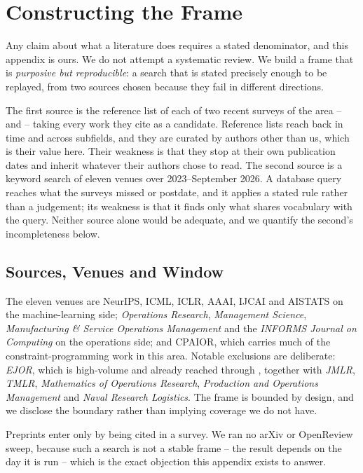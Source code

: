 \section{Constructing the Frame}
\label{sec:ECSearch}

Any claim about what a literature does requires a stated denominator, and this appendix is ours. We
do not attempt a systematic review. We build a frame that is \emph{purposive but reproducible}: a
search that is stated precisely enough to be replayed, from two sources chosen because they fail in
different directions.

The first source is the reference list of each of two recent surveys of the area -- \citet{mandi2024decision}
and \citet{sadana2025survey} -- taking every work they cite as a candidate. Reference lists reach
back in time and across subfields, and they are curated by authors other than us, which is their
value here. Their weakness is that they stop at their own publication dates and inherit whatever
their authors chose to read. The second source is a keyword search of eleven venues over
2023--September 2026. A database query reaches what the surveys missed or postdate, and it applies a
stated rule rather than a judgement; its weakness is that it finds only what shares vocabulary with
the query. Neither source alone would be adequate, and we quantify the second's incompleteness
below.

\subsection{Sources, Venues and Window}

The eleven venues are NeurIPS, ICML, ICLR, AAAI, IJCAI and AISTATS on the machine-learning side;
\emph{Operations Research}, \emph{Management Science}, \emph{Manufacturing \& Service Operations
Management} and the \emph{INFORMS Journal on Computing} on the operations side; and CPAIOR, which
carries much of the constraint-programming work in this area. Notable exclusions are deliberate:
\emph{EJOR}, which is high-volume and already reached through \citet{sadana2025survey}, together
with \emph{JMLR}, \emph{TMLR}, \emph{Mathematics of Operations Research}, \emph{Production and
Operations Management} and \emph{Naval Research Logistics}. The frame is bounded by design, and we
disclose the boundary rather than implying coverage we do not have.

Preprints enter only by being cited in a survey. We ran no arXiv or OpenReview sweep, because such a
search is not a stable frame -- the result depends on the day it is run -- which is the exact
objection this appendix exists to answer.

